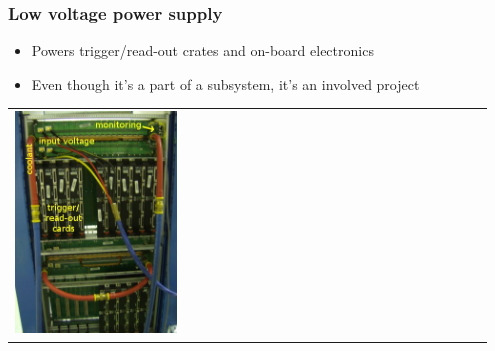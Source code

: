 \documentclass[compress]{beamer}
\begin{document}
\begin{frame}
\frametitle{Low voltage power supply}
\vspace{-0.3 cm}
\begin{itemize}
  \item Powers trigger/read-out crates and on-board electronics
  \item Even though it's a part of a subsystem, it's an involved project
\end{itemize}

\vspace{0.3 cm}
\begin{tabular}{p{0.35\linewidth} p{0.6\linewidth}}
  \begin{minipage}{\linewidth}
    \includegraphics[width=\linewidth]{plots/teststand_back.jpg}
  \end{minipage} &
  \begin{minipage}{\linewidth}

\end{minipage}
\end{tabular}
\end{frame}
\end{document}

